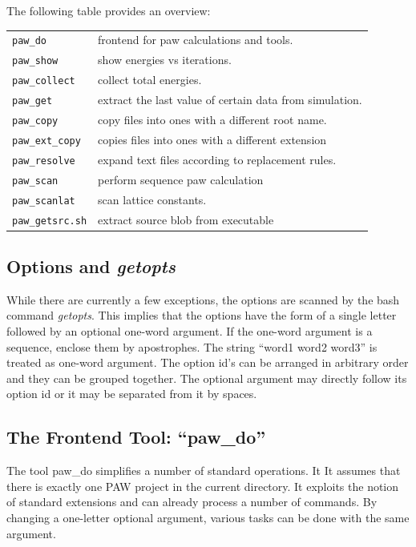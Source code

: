 \documentclass[final,12pt,makeidx,DIV=calc]{article}
\begin{document}
{{{The following table provides an overview:\\
\begin{center}
\begin{tabular}{ll}
\verb|paw_do|      & frontend for paw calculations and tools. \\
\verb|paw_show|    & show energies vs iterations. \\
\verb|paw_collect| & collect total energies. \\
\verb|paw_get|     & extract the last value of certain data from simulation.\\
\verb|paw_copy|    & copy files into ones with a different root name.\\
\verb|paw_ext_copy|& copies files into ones with a different extension\\
\verb|paw_resolve| & expand text files according to replacement rules.\\
\verb|paw_scan|    & perform sequence paw calculation \\
\verb|paw_scanlat| & scan lattice constants. \\
\verb|paw_getsrc.sh| & extract source blob from executable\\
\end{tabular}
\end{center}

\subsection{Options and \textit{getopts}}
While there are currently a few exceptions, the options are scanned by
the bash command \textit{getopts}. This implies that the options have
the form of a single letter followed by an optional one-word
argument. If the one-word argument is a sequence, enclose them by
apostrophes. The string ``word1 word2 word3'' is treated as one-word
argument.  The option id's can be arranged in arbitrary order and they
can be grouped together. The optional argument may directly follow its
option id or it may be separated from it by spaces.

\subsection{The Frontend Tool: ``paw\_do''}
\label{sec:pawshow}
The tool paw\_do simplifies a number of standard operations.  It It
assumes that there is exactly one PAW project in the current
directory.  It exploits the notion of standard extensions and can
already process a number of commands. By changing a one-letter
optional argument, various tasks can be done with the same argument.


}}}
\end{document}
